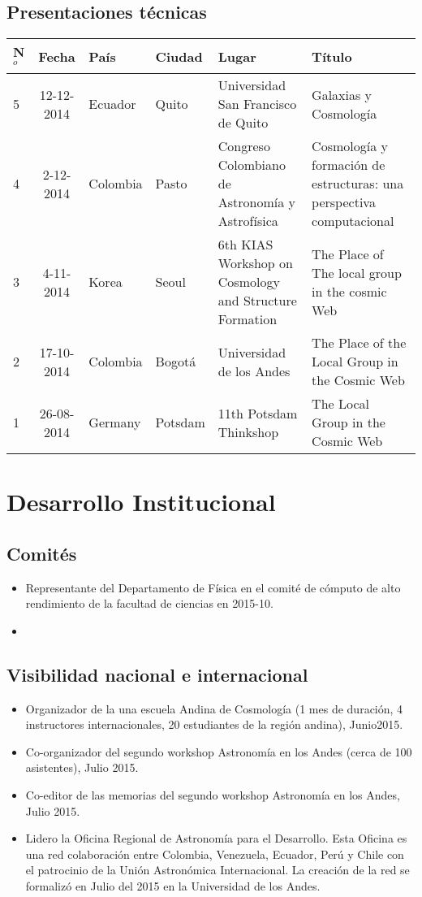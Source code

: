 \documentclass{article}
\begin{document}
\subsection{Presentaciones t\'ecnicas}

\begin{tabular}{l c l l p{2cm} p{5cm}}\hline
N$^{o}$ & Fecha & Pa\'is & Ciudad & Lugar & T\'itulo \\\hline
5 & 12-12-2014 & Ecuador & Quito & Universidad San Francisco de Quito & Galaxias y Cosmolog\'ia\\
4 & 2-12-2014 & Colombia & Pasto & Congreso Colombiano de Astronom\'ia y Astrof\'isica & Cosmolog\'ia y formaci\'on de estructuras: una perspectiva computacional\\
3 & 4-11-2014 & Korea & Seoul & 6th KIAS Workshop on Cosmology and Structure Formation & The Place of The local group in the cosmic Web\\
2 & 17-10-2014 & Colombia & Bogot\'a & Universidad de los Andes & The
Place of the Local Group in the Cosmic Web\\
1 & 26-08-2014 & Germany & Potsdam & 11th Potsdam Thinkshop & The Local
Group in the Cosmic Web\\ \hline
\end{tabular}
\section{Desarrollo Institucional}

\subsection{Comit\'es}
\begin{itemize}
\item {Representante del Departamento de F\'isica en el comit\'e
  de c\'omputo de alto rendimiento de la facultad de ciencias en 2015-10}.
\item {}
\end{itemize}


\subsection{Visibilidad nacional e internacional}
\begin{itemize}
\item {Organizador de la una escuela Andina de Cosmolog\'ia (1 mes de
  duraci\'on, 4 instructores internacionales, 20 estudiantes de la
  regi\'on andina), Junio2015.}
\item {Co-organizador del segundo workshop Astronom\'ia en los Andes
  (cerca de 100 asistentes), Julio 2015.}
\item {Co-editor de las memorias del segundo workshop Astronom\'ia en
  los Andes, Julio 2015.}
\item {Lidero la Oficina Regional de Astronom\'ia para el
  Desarrollo. Esta Oficina es una red colaboraci\'on entre Colombia,
  Venezuela, Ecuador, Per\'u y Chile con el patrocinio de la Uni\'on
  Astron\'omica Internacional. La creaci\'on de la red se formaliz\'o
  en Julio del 2015 en la Universidad de los Andes.}   
\end{itemize}
\end{document}
